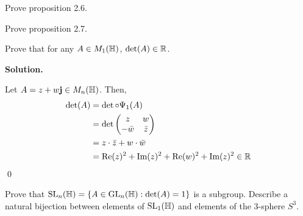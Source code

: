\documentclass[12pt]{book}
\theoremstyle{definition}
\newenvironment{solution}
{%
  \par\noindent\textbf{Solution.}\quad
}
{%
  \qed\par
}
\begin{document}
\begin{taggedexercise}[\textcolor{red}{TODO}]
  Prove proposition 2.6.
\end{taggedexercise}

\begin{taggedexercise}[\textcolor{red}{TODO}]
  Prove proposition 2.7.
\end{taggedexercise}

\begin{taggedexercise}[\textcolor{green}{Complete}]
  Prove that for any $A \in M_1(\mathbb{H})$, $\det(A) \in \mathbb{R}$.
\end{taggedexercise}

\begin{solution}
  Let $A = z+w\mathbf{j} \in M_n(\mathbb{H})$.
  Then,
  \[\begin{aligned}
    \det(A) &= \det \circ \Psi_1(A)\\
           &= \det \begin{pmatrix} z & w \\ -\bar{w} & \bar{z} \end{pmatrix} \\
           &= z \cdot \bar{z} + w \cdot \bar{w} \\
           &= \text{Re}(z)^2 + \text{Im}(z)^2 + \text{Re}(w)^2 + \text{Im}(z)^2 \in \mathbb{R}
  \end{aligned}\]
\end{solution}

\begin{taggedexercise}[\textcolor{green}{Complete}]
  Prove that $\mathrm{SL}_{n}(\mathbb{H}) = \{A \in \mathrm{GL}_{n}(\mathbb{H}) : \det(A) = 1\}$ is a subgroup.
  Describe a natural bijection between elements of $\mathrm{SL}_{1}(\mathbb{H})$ and elements of the 3-sphere $S^3$.
\end{taggedexercise}
\end{document}
